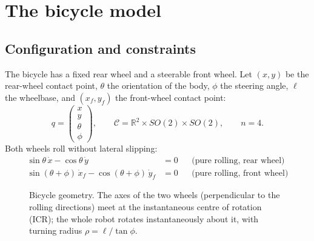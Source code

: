 \documentclass[11pt,a4paper]{article}
\newcommand{\R}{\mathbb{R}}
\theoremstyle{plain}
\theoremstyle{definition}
\theoremstyle{remark}
\newcommand{\wheel}[3]{\begin{scope}[shift={#1},rotate=#2]
  \draw[fill=#3,rounded corners=1pt] (-0.4,-0.12) rectangle (0.4,0.12);\end{scope}}
\begin{document}
\section{The bicycle model}

\subsection{Configuration and constraints}

The bicycle has a fixed rear wheel and a steerable front wheel. Let $(x,y)$ be the rear-wheel contact point, $\theta$ the orientation of the body, $\phi$ the steering angle, $\ell$ the wheelbase, and $(x_f,y_f)$ the front-wheel contact point:
\[
q=\begin{pmatrix}x\\y\\\theta\\\phi\end{pmatrix},\qquad
\mathcal C=\R^2\times SO(2)\times SO(2),\qquad n=4 .
\]
Both wheels roll without lateral slipping:
\begin{align}
\sin\theta\,\dot x-\cos\theta\,\dot y&=0 &&\text{(pure rolling, rear wheel)}\tag{R}\\
\sin(\theta+\phi)\,\dot x_f-\cos(\theta+\phi)\,\dot y_f&=0 &&\text{(pure rolling, front wheel)}\tag{F}
\end{align}

\begin{figure}[H]
\centering
{}
\caption{Bicycle geometry. The axes of the two wheels (perpendicular to the rolling directions) meet at the instantaneous centre of rotation (ICR); the whole robot rotates instantaneously about it, with turning radius $\rho=\ell/\tan\phi$.}
\label{fig:bicycle}
\end{figure}
\end{document}
